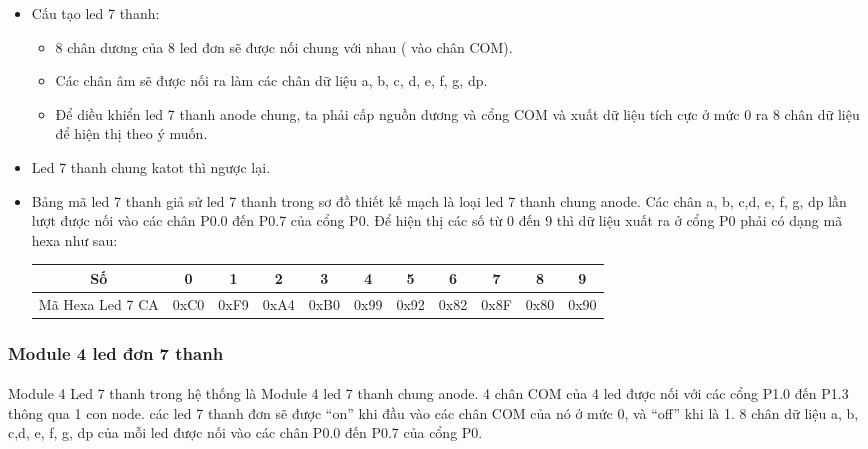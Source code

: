 \documentclass[../report.tex]{subfiles}
\begin{document}
\begin{itemize}
    \item Cấu tạo led 7 thanh:
        \begin{itemize}
            \item 8 chân dương của 8 led đơn sẽ được nối chung với nhau ( vào chân COM).
            \item Các chân âm sẽ được nối ra làm các chân dữ liệu a, b, c, d, e, f, g, dp.
            \item Để diều khiển led 7 thanh anode chung, ta phải cấp nguồn dương và cổng COM và xuất dữ liệu tích cực ở mức 0 ra 8 chân dữ liệu để hiện thị theo ý muốn. 
        \end{itemize}
    \item Led 7 thanh chung katot thì ngược lại.

    \item Bảng mã led 7 thanh giả sử led 7 thanh trong sơ đồ thiết kế mạch là loại led 7 thanh chung anode. Các chân a, b, c,d, e, f, g, dp lần lượt được nối vào các chân P0.0 đến P0.7 của cổng P0.
	Để hiện thị các số từ 0 đến 9 thì dữ liệu xuất ra ở cổng P0 phải có dạng mã hexa như sau:
            \begin{center}
                    \begin{tabular}{ |c|c|c|c|c|c|c|c|c|c|c| } 
                    \hline
                    Số & 0 & 1 & 2 & 3 & 4 & 5 & 6 & 7 & 8 & 9  \\
                    \hline
                    Mã Hexa Led 7 CA & 0xC0 & 0xF9 & 0xA4 & 0xB0 & 0x99 & 0x92 & 0x82 & 0x8F & 0x80 & 0x90\\ 
                    \hline
                    \end{tabular}
                    
            \end{center}
\end{itemize}

\subsubsection{Module 4 led đơn  7 thanh}
\paragraph*{}Module 4 Led 7 thanh trong hệ thống là Module 4 led 7 thanh chung anode. 4 chân COM của 4 led được nối với các cổng P1.0 đến P1.3 thông qua 1 con node. các led 7 thanh đơn sẽ được “on” khi đầu vào các chân COM của nó ở mức 0, và “off” khi là 1. 
8 chân dữ liệu a, b, c,d, e, f, g, dp của mỗi led được nối vào các chân P0.0 đến P0.7 của cổng P0.
\end{document}
